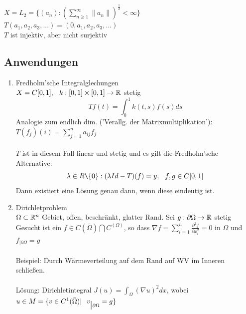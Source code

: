 \begin{beispiel}
$X = L_{2} = \{ (a_{n}): \left( \sum_{n \geq 1}^{\infty} \| a_{n} \| \right)^{\frac{1}{2}} < \infty \}$	\\
$T ( a_{1}, a_{2}, a_{3}, ...) = ( 0, a_{1}, a_{2}, a_{3}, ...)$ \\

$T$ ist injektiv, aber nicht surjektiv
\end{beispiel}

\subsection{Anwendungen}

\begin{enumerate}
	\item Fredholm'sche Integralglechungen  \\
	$X = C[0, 1], \hspace{0.25cm} k: [0, 1] \times [0, 1] \rightarrow \mathbb{R}$ stetig \\
	\[ Tf(t) = \int_{0}^{1} k(t, s) f(s) ds \]
	Analogie zum endlich dim. ('Verallg. der Matrixmultiplikation'):  $ T(f_{j})(i) = \sum_{j = 1}^{n} a_{ij}f_{j}$ \\ \\
 	$T$ ist in diesem Fall linear und stetig und es gilt die Fredholm'sche Alternative:
	\[ \lambda \in R \verb|\| \{0\}: (\lambda Id - T)(f) = y, \hspace{0.25cm} f,g \in C[0, 1] \]
	Dann existiert eine Lösung genau dann, wenn diese eindeutig ist. \\
	\item Dirichletproblem \\
	$\Omega \subset \mathbb{R}^n$ Gebiet, offen, beschränkt, glatter Rand. Sei $g: \partial \Omega \rightarrow \mathbb{R}$ stetig \\ 
	Gesucht ist ein $f \in C(\bar \Omega) \bigcap  C^(\Omega)$, so dass $\nabla f = \sum_{i = 1}^{n} \frac{\partial^{2} f}{\partial x_{i}^2} = 0$ in $\Omega$ und $f_{\big| \partial \Omega}= g$ \\ \\
	Beispiel: Durch Wärmeverteilung auf dem Rand auf WV im Inneren schlie{\ss}en. \\ \\
	Lösung: Dirichletintegral $J(u) = \int_{\Omega} (\nabla u )^{2} dx$, wobei $ u \in M = \{ v \in C^{1}(\bar \Omega) | \hspace{0.25cm} v_{\big| \partial \Omega} = g \}$ \\

\end{enumerate}
